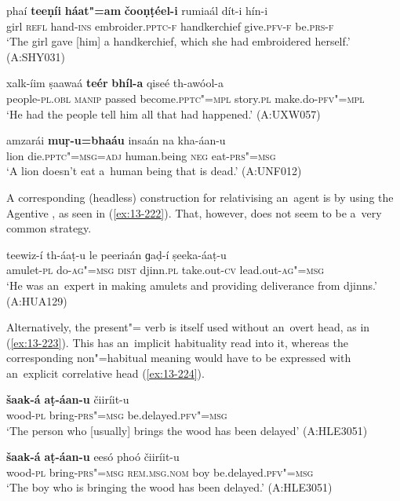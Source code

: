 \begin{exe}
\ex
\label{ex:13-219}
\gll phaí \textbf{teeṇíi} \textbf{háat"=am} \textbf{čooṇṭéel-i} rumiaál dít-i hín-i\\
girl \textsc{refl} hand-\textsc{ins} embroider.\textsc{pptc-f} handkerchief give.\textsc{pfv-f} be.\textsc{prs-f}\\
\glt `The girl gave [him] a handkerchief, which she had embroidered herself.' (A:SHY031)

\ex
\label{ex:13-220}
\gll xalk-íim ṣaawaá \textbf{teér} \textbf{bhíl-a} qiseé th-awóol-a\\
people-\textsc{pl.obl} \textsc{manip} passed become.\textsc{pptc"=mpl} story.\textsc{pl} make.do-\textsc{pfv"=mpl}\\
\glt `He had the people tell him all that had happened.' (A:UXW057)

\ex
\label{ex:13-221}
\gll amzarái \textbf{muṛ-u=bhaáu} insaán na  kha-áan-u \\
lion die.\textsc{pptc"=msg=adj} human.being \textsc{neg} eat-\textsc{prs"=msg} \\
\glt `A lion doesn't eat a~human being that is dead.' (A:UNF012) 
\end{exe}

A corresponding (headless) construction for relativising an~agent  is by using the Agentive , as seen in (\ref{ex:13-222}). That, however, does not seem to be a~very common strategy. 

\begin{exe}
\ex
\label{ex:13-222}
\gll teewiz-í th-áaṭ-u le peeriaán ɡaḍ-í  ṣeeka-áaṭ-u \\
amulet-\textsc{pl} do-\textsc{ag"=msg} \textsc{dist} djinn.\textsc{pl} take.out-\textsc{cv} lead.out-\textsc{ag"=msg} \\
\glt `He was an~expert in making amulets and providing deliverance from djinns.' (A:HUA129) 
\end{exe}

Alternatively, the present"= verb is itself used without an~overt head, as in (\ref{ex:13-223}). This has an~implicit habituality read into it, whereas the corresponding non"=habitual meaning would have to be expressed with an~explicit correlative head (\ref{ex:13-224}).

\begin{exe}
\ex
\label{ex:13-223}
\gll \textbf{šaak-á} \textbf{aṭ-áan-u} čiiríit-u  \\
wood-\textsc{pl} bring-\textsc{prs"=msg} be.delayed.\textsc{pfv"=msg} \\
\glt `The person who [usually] brings the wood has been delayed' (A:HLE3051)

\ex
\label{ex:13-224}
\gll \textbf{šaak-á} \textbf{aṭ-áan-u} eesó phoó čiiríit-u  \\
wood-\textsc{pl} bring-\textsc{prs"=msg} \textsc{rem.ms}\textsc{g.}\textsc{nom} boy be.delayed.\textsc{pfv"=msg}  \\
\glt `The boy who is bringing the wood has been delayed.' (A:HLE3051)
\end{exe}

